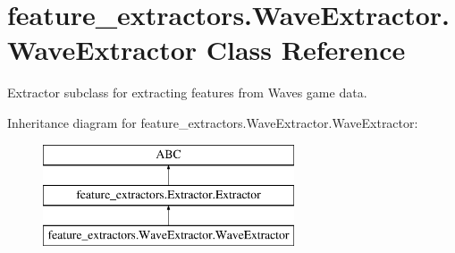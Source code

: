 \hypertarget{classfeature__extractors_1_1_wave_extractor_1_1_wave_extractor}{}\section{feature\+\_\+extractors.\+Wave\+Extractor.\+Wave\+Extractor Class Reference}
\label{classfeature__extractors_1_1_wave_extractor_1_1_wave_extractor}


Extractor subclass for extracting features from Waves game data.  


Inheritance diagram for feature\+\_\+extractors.\+Wave\+Extractor.\+Wave\+Extractor\+:\begin{figure}[H]
\begin{center}
\leavevmode
\includegraphics[height=3.000000cm]{classfeature__extractors_1_1_wave_extractor_1_1_wave_extractor}
\end{center}
\end{figure}
